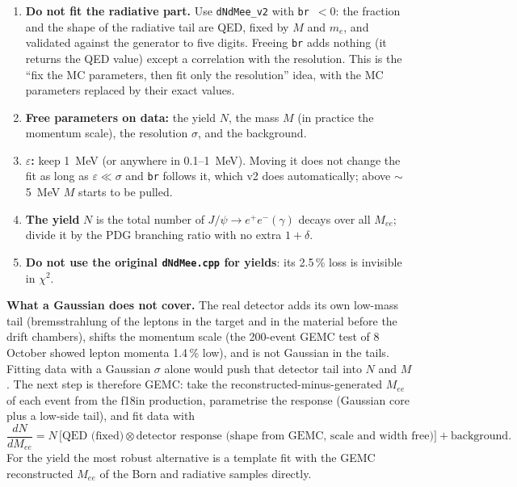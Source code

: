 \documentclass[11pt]{article}
\newcommand{\Mee}{M_{ee}}
\newcommand{\Jpsi}{J/\psi}
\begin{document}
\begin{enumerate}
\item \textbf{Do not fit the radiative part.}  Use \texttt{dNdMee\_v2} with
  \texttt{br}~$<0$: the fraction and the shape of the radiative tail are QED, fixed
  by $M$ and $m_e$, and validated against the generator to five digits.  Freeing
  \texttt{br} adds nothing (it returns the QED value) except a correlation with the
  resolution.  This is the ``fix the MC parameters, then fit only the resolution''
  idea, with the MC parameters replaced by their exact values.
\item \textbf{Free parameters on data:} the yield $N$, the mass $M$ (in practice the
  momentum scale), the resolution $\sigma$, and the background.
\item \textbf{$\varepsilon$:} keep 1~MeV (or anywhere in 0.1--1~MeV).  Moving it does
  not change the fit as long as $\varepsilon\ll\sigma$ and \texttt{br} follows it,
  which v2 does automatically; above $\sim$5~MeV $M$ starts to be pulled.
\item \textbf{The yield} $N$ is the total number of $\Jpsi\to e^+e^-(\gamma)$ decays
  over all $\Mee$; divide it by the PDG branching ratio with no extra $1+\delta$.
\item \textbf{Do not use the original \texttt{dNdMee.cpp} for yields}: its 2.5\,\% loss
  is invisible in $\chi^2$.
\end{enumerate}

\textbf{What a Gaussian does not cover.}  The real detector adds its own low-mass tail
(bremsstrahlung of the leptons in the target and in the material before the drift
chambers), shifts the momentum scale (the 200-event GEMC test of 8 October showed
lepton momenta 1.4\,\% low), and is not Gaussian in the tails.  Fitting data with a
Gaussian $\sigma$ alone would push that detector tail into $N$ and $M$.  The next
step is therefore GEMC: take the reconstructed-minus-generated $\Mee$ of each event
from the f18in production, parametrise the response (Gaussian core plus a low-side
tail), and fit data with
\[
  \frac{dN}{d\Mee} = N\,\Big[\text{QED (fixed)} \otimes
  \text{detector response (shape from GEMC, scale and width free)}\Big]
  + \text{background}.
\]
For the yield the most robust alternative is a template fit with the GEMC
reconstructed $\Mee$ of the Born and radiative samples directly.
\end{document}

